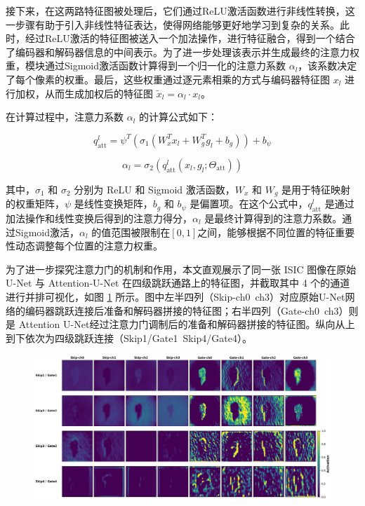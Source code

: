 接下来，在这两路特征图被处理后，它们通过ReLU激活函数进行非线性转换，这一步骤有助于引入非线性特征表达，使得网络能够更好地学习到复杂的关系。此时，经过ReLU激活的特征图被送入一个加法操作，进行特征融合，得到一个结合了编码器和解码器信息的中间表示。为了进一步处理该表示并生成最终的注意力权重，模块通过Sigmoid激活函数计算得到一个归一化的注意力系数 $\alpha_l$，该系数决定了每个像素的权重。最后，这些权重通过逐元素相乘的方式与编码器特征图 $x_l$ 进行加权，从而生成加权后的特征图 $\tilde{x}_l = \alpha_l \cdot x_l$。

在计算过程中，注意力系数 $\alpha_l$ 的计算公式如下：

\begin{equation}
    q_{\text{att}}^l = \psi^T \left( \sigma_1 (W_x^T x_l + W_g^T g_l + b_g) \right) + b_\psi
\end{equation}

\begin{equation}
    \alpha_l = \sigma_2 \left( q_{\text{att}}^l(x_l, g_l; \Theta_{\text{att}}) \right)
\end{equation}

其中，$\sigma_1$ 和 $\sigma_2$ 分别为 ReLU 和 Sigmoid 激活函数，$W_x$ 和 $W_g$ 是用于特征映射的权重矩阵，$\psi$ 是线性变换矩阵，$b_g$ 和 $b_\psi$ 是偏置项。在这个公式中，$q_{\text{att}}^l$ 是通过加法操作和线性变换后得到的注意力得分，$\alpha_l$ 是最终计算得到的注意力系数。通过Sigmoid激活，$\alpha_l$ 的值范围被限制在$[0, 1]$之间，能够根据不同位置的特征重要性动态调整每个位置的注意力权重。

为了进一步探究注意力门的机制和作用，本文直观展示了同一张 ISIC 图像在原始 U-Net 与 Attention-U-Net 在四级跳跃通路上的特征图，并截取其中 4 个的通道进行并排可视化，如图 \ref{fig:skip_vs_gate_vis} 所示。图中左半四列（Skip-ch0~ch3）对应原始U-Net网络的编码器跳跃连接后准备和解码器拼接的特征图；右半四列（Gate-ch0~ch3）则是 Attention U-Net经过注意力门调制后的准备和解码器拼接的特征图。纵向从上到下依次为四级跳跃连接（Skip1/Gate1~Skip4/Gate4）。

\begin{figure}
    \centering
    \includegraphics[width=\textwidth]{fig/unet_vs_attunet_feature_compare.png}
    \caption{}
    \label{fig:skip_vs_gate_vis}
\end{figure}

